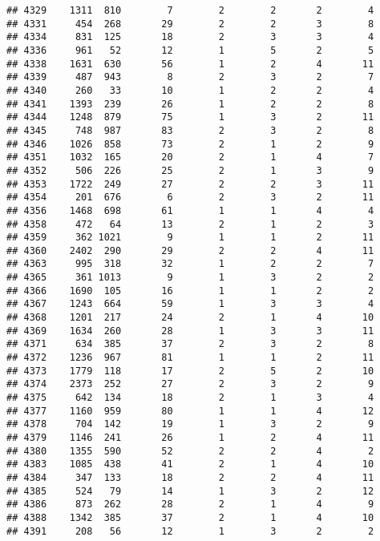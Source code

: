 \documentclass[]{article}
\begin{document}
\begin{verbatim}
## 4329    1311  810        7        2        2       2        4
## 4331     454  268       29        2        2       3        8
## 4334     831  125       18        2        3       3        4
## 4336     961   52       12        1        5       2        5
## 4338    1631  630       56        1        2       4       11
## 4339     487  943        8        2        3       2        7
## 4340     260   33       10        1        2       2        4
## 4341    1393  239       26        1        2       2        8
## 4344    1248  879       75        1        3       2       11
## 4345     748  987       83        2        3       2        8
## 4346    1026  858       73        2        1       2        9
## 4351    1032  165       20        2        1       4        7
## 4352     506  226       25        2        1       3        9
## 4353    1722  249       27        2        2       3       11
## 4354     201  676        6        2        3       2       11
## 4356    1468  698       61        1        1       4        4
## 4358     472   64       13        2        1       2        3
## 4359     362 1021        9        1        1       2       11
## 4360    2402  290       29        2        2       4       11
## 4363     995  318       32        1        2       2        7
## 4365     361 1013        9        1        3       2        2
## 4366    1690  105       16        1        1       2        2
## 4367    1243  664       59        1        3       3        4
## 4368    1201  217       24        2        1       4       10
## 4369    1634  260       28        1        3       3       11
## 4371     634  385       37        2        3       2        8
## 4372    1236  967       81        1        1       2       11
## 4373    1779  118       17        2        5       2       10
## 4374    2373  252       27        2        3       2        9
## 4375     642  134       18        2        1       3        4
## 4377    1160  959       80        1        1       4       12
## 4378     704  142       19        1        3       2        9
## 4379    1146  241       26        1        2       4       11
## 4380    1355  590       52        2        2       4        2
## 4383    1085  438       41        2        1       4       10
## 4384     347  133       18        2        2       4       11
## 4385     524   79       14        1        3       2       12
## 4386     873  262       28        2        1       4        9
## 4388    1342  385       37        2        1       4       10
## 4391     208   56       12        1        3       2        2

\end{verbatim}
\end{document}
